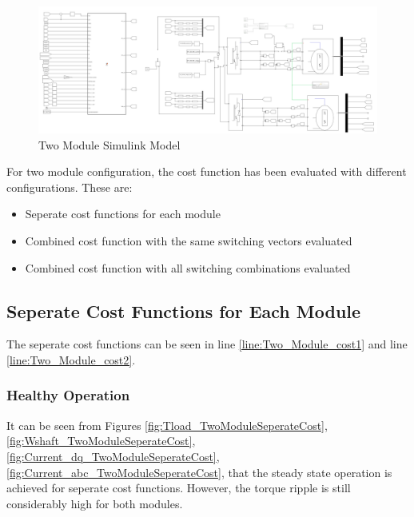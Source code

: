 \documentclass{article}
\begin{document}
\begin{figure}[H]
\centering
\includegraphics[scale=0.4]{Figures/TwoModuleSimulinkModel.PNG}
\caption{Two Module Simulink Model}
\label{fig:TwoModuleSimulinkModel}
\end{figure}

For two module configuration, the cost function has been evaluated with different configurations. These are:
\begin{itemize}
    \item Seperate cost functions for each module
    \item Combined cost function with the same switching vectors evaluated
    \item Combined cost function with all switching combinations evaluated
\end{itemize}

\subsection{Seperate Cost Functions for Each Module}
The seperate cost functions can be seen in line \ref{line:Two_Module_cost1} and line \ref{line:Two_Module_cost2}. 


\subsubsection{Healthy Operation}


It can be seen from Figures \ref{fig:Tload_TwoModuleSeperateCost}, \ref{fig:Wshaft_TwoModuleSeperateCost}, \ref{fig:Current_dq_TwoModuleSeperateCost}, \ref{fig:Current_abc_TwoModuleSeperateCost}, that the steady state operation is achieved for seperate cost functions. However, the torque ripple is still considerably high for both modules.
\end{document}
